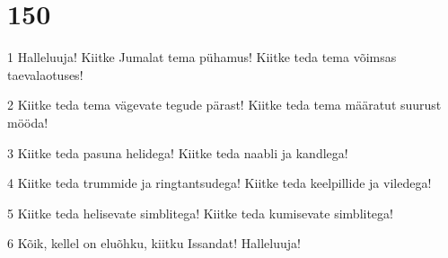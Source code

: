 \chapter{150}

\par 1 Halleluuja! Kiitke Jumalat tema pühamus! Kiitke teda tema võimsas taevalaotuses!
\par 2 Kiitke teda tema vägevate tegude pärast! Kiitke teda tema määratut suurust mööda!
\par 3 Kiitke teda pasuna helidega! Kiitke teda naabli ja kandlega!
\par 4 Kiitke teda trummide ja ringtantsudega! Kiitke teda keelpillide ja viledega!
\par 5 Kiitke teda helisevate simblitega! Kiitke teda kumisevate simblitega!
\par 6 Kõik, kellel on eluõhku, kiitku Issandat! Halleluuja!


